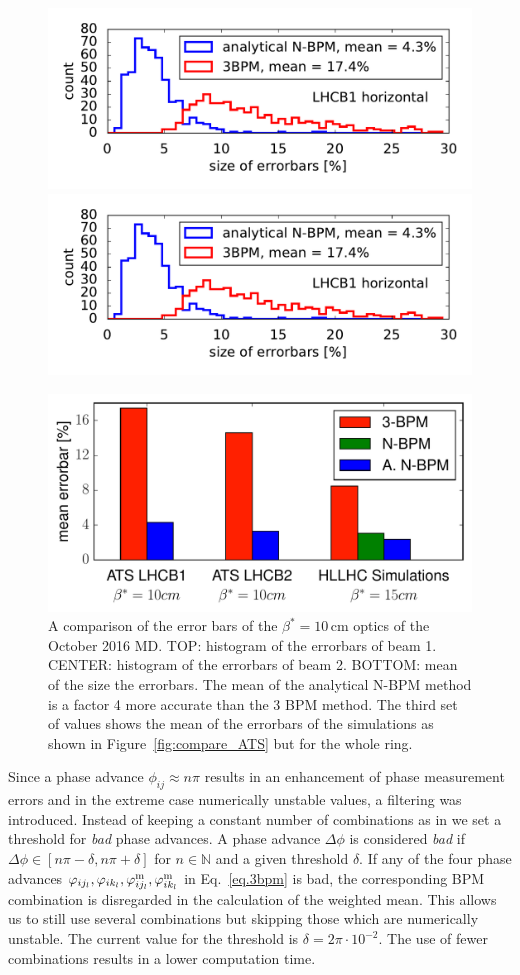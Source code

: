 \begin{figure}
	\centering
	\includegraphics[width=.49\linewidth]{comparison_errorbars_Beam1}
	\includegraphics[width=.49\linewidth]{comparison_errorbars_Beam2}
	
	\includegraphics[width=.7\linewidth]{mean_errorbars}
	
	\caption{
        A comparison of the error bars of the $ \beta^*=10\,\text{cm} $ optics of the October 2016 MD.
        TOP: histogram of the errorbars of beam 1. CENTER: histogram of the errorbars of beam 2.
        BOTTOM: mean of the size the errorbars. The mean of the analytical N-BPM method is a factor
        4 more accurate than the 3 BPM method. The third set of values shows the mean of the errorbars
        of the simulations as shown in Figure~\ref{fig:compare_ATS} but for the whole ring.
        }
	\label{fig:HL_report/comparison_errorbars}
\end{figure}
Since a phase advance $ \phi_{ij} \approx n\pi $ results in an enhancement of phase measurement errors and in the extreme case numerically unstable values, a filtering was introduced. Instead of keeping a constant number of combinations as in \cite{nbpm} we set a threshold for \emph{bad} phase advances. A phase advance $ \Delta \phi $ is considered \emph{bad} if $ \Delta \phi \in [ n\pi - \delta, n\pi + \delta ] $ for $ n\in \mathbb{N} $ and a given threshold $ \delta $. If any of the four phase advances $ \varphi_{ij_l}, \varphi_{ik_l},\varphi_{ij_l}^\text{m},\varphi_{ik_l}^\text{m} $ in Eq.~\eqref{eq.3bpm} is bad, the corresponding BPM combination is disregarded in the calculation of the weighted mean. This allows us to still use several combinations but skipping those which are numerically unstable. The current value for the threshold is $ \delta = 2\pi \cdot 10^{-2}$. The use of fewer combinations results in a lower computation time. 


